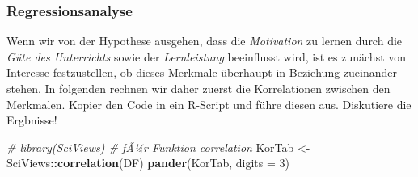 \documentclass[]{article}
\newenvironment{Shaded}{\begin{snugshade}}{\end{snugshade}}
\newcommand{\CommentTok}[1]{\textcolor[rgb]{0.56,0.35,0.01}{\textit{#1}}}
\newcommand{\DataTypeTok}[1]{\textcolor[rgb]{0.13,0.29,0.53}{#1}}
\newcommand{\DecValTok}[1]{\textcolor[rgb]{0.00,0.00,0.81}{#1}}
\newcommand{\KeywordTok}[1]{\textcolor[rgb]{0.13,0.29,0.53}{\textbf{#1}}}
\newcommand{\NormalTok}[1]{#1}
\newcommand{\OperatorTok}[1]{\textcolor[rgb]{0.81,0.36,0.00}{\textbf{#1}}}
\newcommand{\StringTok}[1]{\textcolor[rgb]{0.31,0.60,0.02}{#1}}
\begin{document}
\hypertarget{regressionsanalyse}{%
\subsubsection*{Regressionsanalyse}\label{regressionsanalyse}}

Wenn wir von der Hypothese ausgehen, dass die \emph{Motivation} zu lernen durch die \emph{Güte des Unterrichts} sowie der \emph{Lernleistung} beeinflusst wird, ist es zunächst von Interesse festzustellen, ob dieses Merkmale überhaupt in Beziehung zueinander stehen. In folgenden rechnen wir daher zuerst die Korrelationen zwischen den Merkmalen. Kopier den Code in ein R-Script und führe diesen aus. Diskutiere die Ergbnisse!

\begin{Shaded}
\begin{Highlighting}[]
    \CommentTok{# library(SciViews) # fÃ¼r Funktion correlation}
\NormalTok{    KorTab <-}\StringTok{ }\NormalTok{SciViews}\OperatorTok{::}\KeywordTok{correlation}\NormalTok{(DF)}
    \KeywordTok{pander}\NormalTok{(KorTab, }\DataTypeTok{digits =} \DecValTok{3}\NormalTok{)}
\end{Highlighting}
\end{Shaded}
\end{document}
